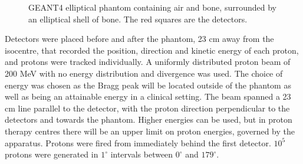 \documentclass[11pt,a4paper]{article}
\begin{document}
\begin{figure}[htp]
  \centering
  \hspace{0.5em}%
 \caption{GEANT4 elliptical phantom containing air and bone, surrounded by an elliptical shell of bone. The red squares are the detectors.}
\label{fig:phantomSlit}
\end{figure}

Detectors were placed before and after the phantom, 23 cm away from the isocentre, that recorded the position, direction and kinetic energy of each proton, and protons were tracked individually. A uniformly distributed proton beam of 200 MeV with no energy distribution and divergence was used. The choice of energy was chosen as the Bragg peak will be located outside of the phantom as well as being an attainable energy in a clinical setting. The beam spanned a 23 cm line parallel to the detector, with the proton direction perpendicular to the detectors and towards the phantom. Higher energies can be used, but in proton therapy centres there will be an upper limit on proton energies, governed by the apparatus. Protons were fired from immediately behind the first detector. $10^5$ protons were generated in $1^{\circ}$ intervals between $0^{\circ}$ and $179^{\circ}$.
\end{document}

